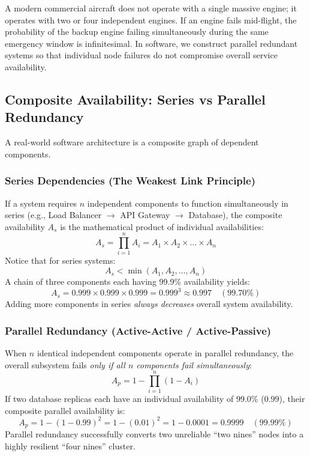 \begin{intuitionbox}
A modern commercial aircraft does not operate with a single massive engine; it operates with two or four independent engines. If an engine fails mid-flight, the probability of the backup engine failing simultaneously during the same emergency window is infinitesimal. In software, we construct parallel redundant systems so that individual node failures do not compromise overall service availability.
\end{intuitionbox}

\subsection{Composite Availability: Series vs Parallel Redundancy}

A real-world software architecture is a composite graph of dependent components.

\subsubsection{Series Dependencies (The Weakest Link Principle)}
If a system requires $n$ independent components to function simultaneously in series (e.g., Load Balancer $\rightarrow$ API Gateway $\rightarrow$ Database), the composite availability $A_s$ is the mathematical product of individual availabilities:
\begin{equation}
A_s = \prod_{i=1}^n A_i = A_1 \times A_2 \times \dots \times A_n
\end{equation}
Notice that for series systems:
\begin{equation}
A_s < \min(A_1, A_2, \dots, A_n)
\end{equation}
A chain of three components each having 99.9\% availability yields:
\begin{equation}
A_s = 0.999 \times 0.999 \times 0.999 = 0.999^3 \approx 0.997 \quad (99.70\%)
\end{equation}
Adding more components in series \textit{always decreases} overall system availability.

\subsubsection{Parallel Redundancy (Active-Active / Active-Passive)}
When $n$ identical independent components operate in parallel redundancy, the overall subsystem fails \textit{only if all $n$ components fail simultaneously}:
\begin{equation}
A_p = 1 - \prod_{i=1}^n (1 - A_i)
\end{equation}
If two database replicas each have an individual availability of 99.0\% ($0.99$), their composite parallel availability is:
\begin{equation}
A_p = 1 - (1 - 0.99)^2 = 1 - (0.01)^2 = 1 - 0.0001 = 0.9999 \quad (99.99\%)
\end{equation}
Parallel redundancy successfully converts two unreliable ``two nines'' nodes into a highly resilient ``four nines'' cluster.

